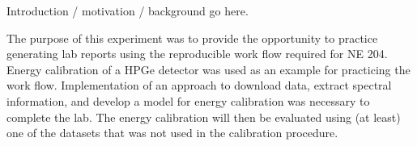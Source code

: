 Introduction / motivation / background go here.

The purpose of this experiment was to provide the opportunity to practice generating lab reports using the reproducible work flow required for NE 204. Energy calibration of a HPGe detector was used as an example for practicing the work flow. Implementation of an approach to download data, extract spectral information, and develop a model for energy calibration was necessary to complete the lab. The energy calibration will then be evaluated using (at least) one of the datasets that was not used in the calibration procedure.
